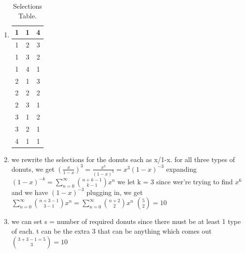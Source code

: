 \documentclass{homework}
\begin{document}
\begin{enumerate}[label=(\alph*)]
\begin{sol}
  \begin{enumerate}[label=(\alph*)]
    \item \begin{table}[hbtp]
              \centering
              \begin{tabular}{|| c | c | c ||} 
                  \hline
                  1 & 1 & 4 \\ \hline
                  1 & 2 & 3 \\ \hline
                  1 & 3 & 2 \\ \hline
                  1 & 4 & 1 \\ \hline
                  2 & 1 & 3 \\ \hline
                  2 & 2 & 2 \\ \hline
                  2 & 3 & 1 \\ \hline
                  3 & 1 & 2 \\ \hline
                  3 & 2 & 1 \\ \hline
                  4 & 1 & 1 \\ \hline
              \end{tabular}
              \caption{Selections Table.}\label{tab:sel}
          \end{table}
        \item  we rewrite the selections for the donuts each as x/1-x. \newline 
          for all three types of donuts, we get $(\frac{x}{1-x})^3 = \frac{x^3}{(1-x)^3} = x^3(1-x)^{-3}$ \newline
          expanding $(1-x)^{-k} = \sum_{n=0}^{\infty} \binom{n+k-1}{k-1}x^n$ \newline
         we let k = 3 since wer're trying to find $x^6$ and we have $(1-x)^{-3}$ \newline
         plugging in, we get $\sum_{n=0}^{\infty} \binom{n+3-1}{3-1}x^n = \sum_{n=0}^{\infty} \binom{n+2}{2}x^n$ \newline
         $\binom{5}{2} = 10$
       \item we can set s = number of required donuts since there must be at least 1 type of each. t can be the extra 3 that can be anything which comes out $\binom{3+3-1=5}{3}=10$
  \end{enumerate}

\end{sol}
\end{enumerate}
\end{document}

